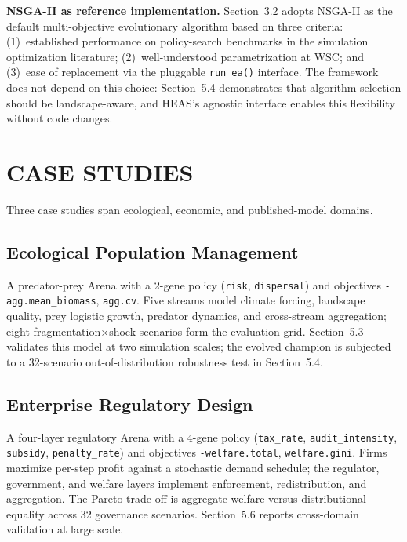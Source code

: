 \documentclass{wscpaperproc}
\begin{document}
\textbf{NSGA-II as reference implementation.} Section~3.2 adopts NSGA-II as the
default multi-objective evolutionary algorithm based on three criteria:
(1)~established performance on policy-search benchmarks in the simulation
optimization literature; (2)~well-understood parametrization at WSC; and
(3)~ease of replacement via the pluggable \texttt{run\_ea()} interface. The
framework does not depend on this choice: Section~5.4 demonstrates that algorithm
selection should be landscape-aware, and HEAS's agnostic interface enables this
flexibility without code changes.

\section{CASE STUDIES}

Three case studies span ecological, economic, and published-model domains.

\subsection{Ecological Population Management}

A predator-prey Arena with a 2-gene policy (\texttt{risk},
\texttt{dispersal}) and objectives \texttt{-agg.mean\_biomass},
\texttt{agg.cv}. Five streams model climate forcing, landscape quality, prey
logistic growth, predator dynamics, and cross-stream aggregation; eight
fragmentation$\times$shock scenarios form the evaluation grid.
Section~5.3 validates this model at two simulation scales; the evolved champion
is subjected to a 32-scenario out-of-distribution robustness test in
Section~5.4.

\subsection{Enterprise Regulatory Design}

A four-layer regulatory Arena with a 4-gene policy
(\texttt{tax\_rate}, \texttt{audit\_intensity}, \texttt{subsidy},
\texttt{penalty\_rate}) and objectives \texttt{-welfare.total},
\texttt{welfare.gini}. Firms maximize per-step profit against a stochastic
demand schedule; the regulator, government, and welfare layers implement
enforcement, redistribution, and aggregation. The Pareto trade-off is
aggregate welfare versus distributional equality across 32 governance scenarios.
Section~5.6 reports cross-domain validation at large scale.
\end{document}
